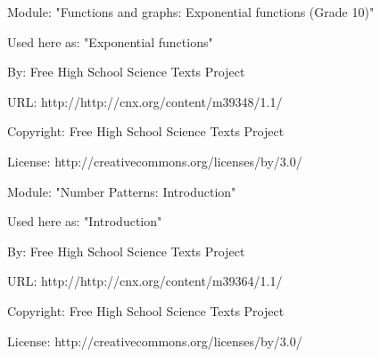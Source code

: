       \par\vspace{9pt}\noindent\begin{minipage}{\textwidth}
      Module: "Functions and graphs: Exponential functions (Grade 10)" \par\nopagebreak\noindent
      Used here as: "Exponential functions" \par\nopagebreak\noindent
        By: Free High School Science Texts Project\par\nopagebreak\noindent
      URL: http://http://cnx.org/content/m39348/1.1/\par\nopagebreak\noindent
      \par\nopagebreak\noindent
      Copyright: Free High School Science Texts Project\par\nopagebreak\noindent
      License:  http://creativecommons.org/licenses/by/3.0/\par\nopagebreak\noindent
      \par\end{minipage}
      \par\vspace{9pt}\noindent\begin{minipage}{\textwidth}
      Module: "Number Patterns: Introduction" \par\nopagebreak\noindent
      Used here as: "Introduction" \par\nopagebreak\noindent
        By: Free High School Science Texts Project\par\nopagebreak\noindent
      URL: http://http://cnx.org/content/m39364/1.1/\par\nopagebreak\noindent
      \par\nopagebreak\noindent
      Copyright: Free High School Science Texts Project\par\nopagebreak\noindent
      License:  http://creativecommons.org/licenses/by/3.0/\par\nopagebreak\noindent
      \par\end{minipage}
